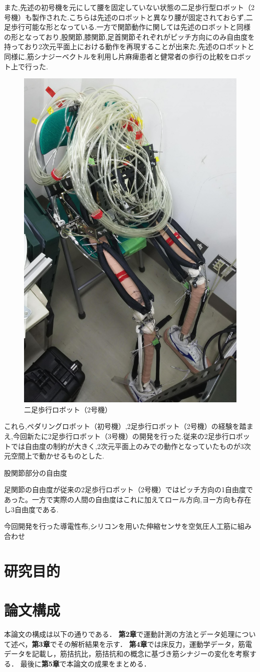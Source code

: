 また,先述の初号機を元にして腰を固定していない状態の二足歩行型ロボット（2号機）も製作された.こちらは先述のロボットと異なり腰が固定されておらず,二足歩行可能な形となっている.一方で関節動作に関しては先述のロボットと同様の形となっており,股関節,膝関節,足首関節それぞれがピッチ方向にのみ自由度を持っており2次元平面上における動作を再現することが出来た.先述のロボットと同様に,筋シナジーベクトルを利用し片麻痺患者と健常者の歩行の比較をロボット上で行った.
\begin{figure}[h]
  \begin{center}
  \includegraphics[width=0.5\columnwidth,clip]{Photo/BackGround/2nd.eps}
  \caption{二足歩行ロボット（2号機）}
  \label{2号機}
 \end{center}
\end{figure}

これら,ペダリングロボット（初号機）,2足歩行ロボット（2号機）の経験を踏まえ,今回新たに2足歩行ロボット（3号機）の開発を行った.従来の2足歩行ロボットでは自由度の制約が大きく,2次元平面上のみでの動作となっていたものが3次元空間上で動かせるものとした.

股関節部分の自由度

足関節の自由度が従来の2足歩行ロボット（2号機）ではピッチ方向の1自由度であった。一方で実際の人間の自由度はこれに加えてロール方向,ヨー方向も存在し3自由度である.

今回開発を行った導電性布,シリコンを用いた伸縮センサを空気圧人工筋に組み合わせ

\section{研究目的}

\section{論文構成}
本論文の構成は以下の通りである．
{\bf 第2章}で運動計測の方法とデータ処理について述べ，{\bf 第3章}でその解析結果を示す．
{\bf 第4章}では床反力，運動学データ，筋電データを記載し，筋拮抗比，筋拮抗和の概念に基づき筋シナジーの変化を考察する．
最後に{\bf 第5章}で本論文の成果をまとめる．
